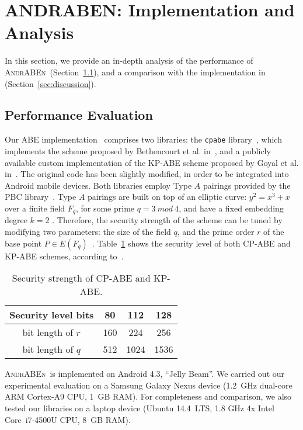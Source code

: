 \documentclass{sig-alternate-2013}
\newcommand{\andraben}{\textsc{AndrABEn}}
\begin{document}
\section{ANDRABEN: Implementation and Analysis}\label{sec:our-implementation}
In this section, we provide an in-depth analysis of the performance of \andraben~(Section~\ref{sec:performance}), and a comparison with the implementation in~\cite{ABE_icc_2014} (Section~\ref{sec:discussion}).

\subsection{Performance Evaluation}\label{sec:performance}

Our ABE implementation~\cite{andraben_impl} comprises two libraries: the {\tt cpabe} library~\cite{cpabe}, which implements the scheme proposed by Bethencourt et al. in~\cite{bethencourt2007ciphertext}, and a publicly available custom implementation \cite{kpabe_impl} of the KP-ABE scheme proposed by Goyal et al. in~\cite{goyal2006attribute}. 
The original code has been slightly modified, in order to be integrated into Android mobile devices.
Both libraries employ Type $A$ pairings provided by the PBC library~\cite{libpbc}. Type $A$ pairings are built on top of an elliptic curve: $y^2 = x^3 + x$ over a finite field $F_q$, for some prime $q=3~mod~4$, and have a fixed embedding degree $k = 2$ \cite{pbc-thesis}. Therefore, the security strength of the scheme can be tuned by modifying two parameters: the size of the field $q$, and the prime order $r$ of the base point $P\in E(F_q)$~\cite{ABE_icc_2014}.
Table~\ref{tbl:table_strength} shows the security level of both CP-ABE and KP-ABE schemes, according to~\cite{brown2001software}.


\def\arraystretch{1.2}
\begin{table}[h]
	\centering
	\small
	\begin{tabular}{| c | c | c | c |}
		\hline 
		{\bf Security level bits} & \bf 80 & \bf 112 & \bf128 \\ \hline
		bit length of $r$ & 160 & 224 & 256 \\ \hline
		bit length of $q$ & 512 & 1024 & 1536 \\ \hline
	\end{tabular}
	\caption{Security strength of CP-ABE and KP-ABE.}
	\label{tbl:table_strength}
\end{table} 


\andraben~is implemented on Android 4.3, ``Jelly Beam''. We carried out our experimental evaluation on a Samsung Galaxy Nexus device (1.2~GHz dual-core ARM Cortex-A9 CPU, 1~GB RAM). For completeness and comparison, we also tested our libraries on a laptop device (Ubuntu 14.4~LTS, 1.8 GHz 4x Intel Core\texttrademark~i7-4500U CPU, 8~GB RAM).
 
\end{document}
